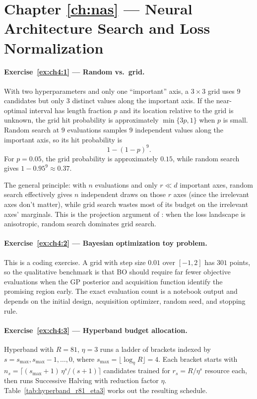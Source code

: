 \documentclass[11pt,a4paper]{report}
\begin{document}
\section{Chapter \ref{ch:nas} --- Neural Architecture Search and Loss Normalization}
\label{sol:ch4}

\paragraph{Exercise~\ref{ex:ch4:1} --- Random vs.\ grid.}
With two hyperparameters and only one ``important'' axis, a $3\times 3$ grid uses $9$ candidates but only $3$ distinct values along the important axis.  If the near-optimal interval has length fraction $p$ and its location relative to the grid is unknown, the grid hit probability is approximately $\min\{3p,1\}$ when $p$ is small.  Random search at $9$ evaluations samples $9$ independent values along the important axis, so its hit probability is
\[
   1 - (1-p)^9 .
\]
For $p=0.05$, the grid probability is approximately $0.15$, while random search gives $1-0.95^9\approx 0.37$.

The general principle: with $n$ evaluations and only $r \ll d$ important axes, random search effectively gives $n$ independent draws on those $r$ axes (since the irrelevant axes don't matter), while grid search wastes most of its budget on the irrelevant axes' marginals.  This is the projection argument of \citet{bergstra2012random}: when the loss landscape is anisotropic, random search dominates grid search.

\paragraph{Exercise~\ref{ex:ch4:2} --- Bayesian optimization toy problem.}
This is a coding exercise.  A grid with step size $0.01$ over $[-1,2]$ has $301$ points, so the qualitative benchmark is that BO should require far fewer objective evaluations when the GP posterior and acquisition function identify the promising region early.  The exact evaluation count is a notebook output and depends on the initial design, acquisition optimizer, random seed, and stopping rule.

\paragraph{Exercise~\ref{ex:ch4:3} --- Hyperband budget allocation.}
Hyperband with $R = 81$, $\eta = 3$ runs a ladder of brackets indexed by $s = s_{\max}, s_{\max}-1, \dots, 0$, where $s_{\max} = \lfloor\log_\eta R\rfloor = 4$.  Each bracket starts with $n_s = \lceil (s_{\max}+1)\,\eta^s / (s+1)\rceil$ candidates trained for $r_s = R / \eta^s$ resource each, then runs Successive Halving with reduction factor $\eta$.  Table~\ref{tab:hyperband_r81_eta3} works out the resulting schedule.
\end{document}

